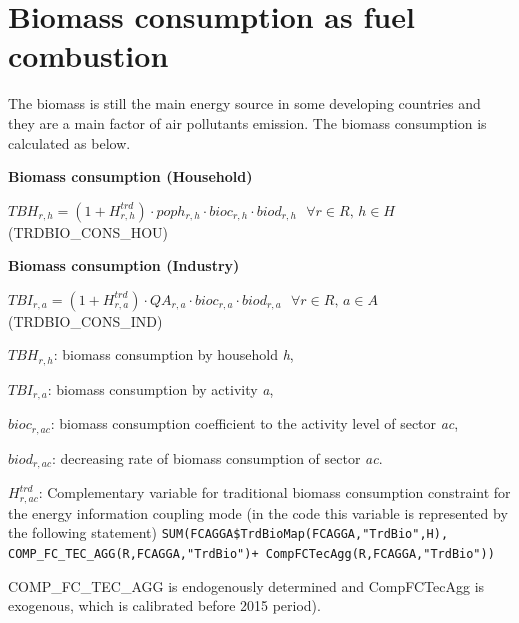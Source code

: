 \documentclass[10pt,a4paper,titlepage,dvipdfmx]{book}
\begin{document}
\section{\label{sec:BioConFueCom}Biomass consumption as fuel combustion}

      The biomass is still the main energy source in some developing countries and they are a main factor of air pollutants emission. The biomass consumption is calculated as below.

\begin{flushleft}\textbf{Biomass consumption (Household)}\end{flushleft}


\begin{center}$TBH_{r,h}=\left(1+H _{r,h}^{trd}\right)\cdot poph_{r,h}\cdot bioc_{r,h}\cdot biod_{r,h}\,\,\,\,\forall r\in R,\,h\in H$ (TRDBIO\_CONS\_HOU)
\end{center}

\begin{flushleft}\textbf{Biomass consumption (Industry)}\end{flushleft}


\begin{center}$TBI_{r,a}=\left(1+H _{r,a}^{trd}\right)\cdot QA_{r,a}\cdot bioc_{r,a}\cdot biod_{r,a}\,\,\,\,\forall r\in R,\,a\in A$ (TRDBIO\_CONS\_IND)\label{ref-0041}
\end{center}

\begin{flushleft}
$TBH_{r,h}$: biomass consumption by household \textit{h},

$TBI_{r,a}$: biomass consumption by activity \textit{a},

$bioc_{r,ac}$: biomass consumption coefficient to the activity level of sector \textit{ac},

$biod_{r,ac}$: decreasing rate of biomass consumption of sector \textit{ac}.

$H _{r,ac}^{trd}$: Complementary variable for traditional biomass consumption constraint for the energy information coupling mode (in the code this variable is represented by the following statement)
\texttt{\textcolor{color-7}{SUM}}\texttt{(FCAGGA\$TrdBioMap(FCAGGA,}\texttt{\textcolor{color-8}{"TrdBio"}}\texttt{,H),
COMP\_FC\_TEC\_AGG(R,FCAGGA,}\texttt{\textcolor{color-8}{"TrdBio"}}\texttt{)+
CompFCTecAgg(R,FCAGGA,}\texttt{\textcolor{color-8}{"TrdBio"}}\texttt{))}
\end{flushleft}

COMP\_FC\_TEC\_AGG  is endogenously determined and CompFCTecAgg is exogenous, which is calibrated before 2015 period).
\end{document}
